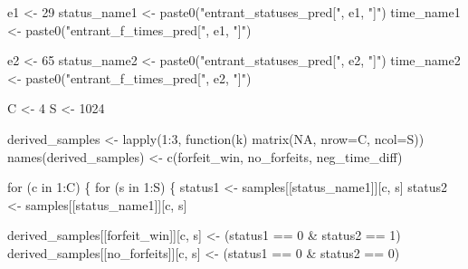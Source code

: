 \documentclass[
  letterpaper,
  DIV=11,
  numbers=noendperiod]{scrartcl}
\newenvironment{Shaded}{\begin{snugshade}}{\end{snugshade}}
\newcommand{\AttributeTok}[1]{\textcolor[rgb]{0.40,0.45,0.13}{#1}}
\newcommand{\ConstantTok}[1]{\textcolor[rgb]{0.56,0.35,0.01}{#1}}
\newcommand{\ControlFlowTok}[1]{\textcolor[rgb]{0.00,0.23,0.31}{#1}}
\newcommand{\DecValTok}[1]{\textcolor[rgb]{0.68,0.00,0.00}{#1}}
\newcommand{\FunctionTok}[1]{\textcolor[rgb]{0.28,0.35,0.67}{#1}}
\newcommand{\NormalTok}[1]{\textcolor[rgb]{0.00,0.23,0.31}{#1}}
\newcommand{\OtherTok}[1]{\textcolor[rgb]{0.00,0.23,0.31}{#1}}
\newcommand{\SpecialCharTok}[1]{\textcolor[rgb]{0.37,0.37,0.37}{#1}}
\newcommand{\StringTok}[1]{\textcolor[rgb]{0.13,0.47,0.30}{#1}}
\begin{document}
\begin{Shaded}
\begin{Highlighting}[]
\NormalTok{e1 }\OtherTok{\textless{}{-}} \DecValTok{29}
\NormalTok{status\_name1 }\OtherTok{\textless{}{-}} \FunctionTok{paste0}\NormalTok{(}\StringTok{"entrant\_statuses\_pred["}\NormalTok{, e1, }\StringTok{"]"}\NormalTok{)}
\NormalTok{time\_name1 }\OtherTok{\textless{}{-}} \FunctionTok{paste0}\NormalTok{(}\StringTok{"entrant\_f\_times\_pred["}\NormalTok{, e1, }\StringTok{"]"}\NormalTok{)}

\NormalTok{e2 }\OtherTok{\textless{}{-}} \DecValTok{65}
\NormalTok{status\_name2 }\OtherTok{\textless{}{-}} \FunctionTok{paste0}\NormalTok{(}\StringTok{"entrant\_statuses\_pred["}\NormalTok{, e2, }\StringTok{"]"}\NormalTok{)}
\NormalTok{time\_name2 }\OtherTok{\textless{}{-}} \FunctionTok{paste0}\NormalTok{(}\StringTok{"entrant\_f\_times\_pred["}\NormalTok{, e2, }\StringTok{"]"}\NormalTok{)}

\NormalTok{C }\OtherTok{\textless{}{-}} \DecValTok{4}
\NormalTok{S }\OtherTok{\textless{}{-}} \DecValTok{1024}

\NormalTok{derived\_samples }\OtherTok{\textless{}{-}} \FunctionTok{lapply}\NormalTok{(}\DecValTok{1}\SpecialCharTok{:}\DecValTok{3}\NormalTok{, }\ControlFlowTok{function}\NormalTok{(k) }\FunctionTok{matrix}\NormalTok{(}\ConstantTok{NA}\NormalTok{, }\AttributeTok{nrow=}\NormalTok{C, }\AttributeTok{ncol=}\NormalTok{S))}
\FunctionTok{names}\NormalTok{(derived\_samples) }\OtherTok{\textless{}{-}} \FunctionTok{c}\NormalTok{(}\StringTok{\textquotesingle{}forfeit\_win\textquotesingle{}}\NormalTok{, }\StringTok{\textquotesingle{}no\_forfeits\textquotesingle{}}\NormalTok{, }\StringTok{\textquotesingle{}neg\_time\_diff\textquotesingle{}}\NormalTok{)}

\ControlFlowTok{for}\NormalTok{ (c }\ControlFlowTok{in} \DecValTok{1}\SpecialCharTok{:}\NormalTok{C) \{}
  \ControlFlowTok{for}\NormalTok{ (s }\ControlFlowTok{in} \DecValTok{1}\SpecialCharTok{:}\NormalTok{S) \{}
\NormalTok{    status1 }\OtherTok{\textless{}{-}}\NormalTok{ samples[[status\_name1]][c, s]}
\NormalTok{    status2 }\OtherTok{\textless{}{-}}\NormalTok{ samples[[status\_name1]][c, s]}

\NormalTok{    derived\_samples[[}\StringTok{\textquotesingle{}forfeit\_win\textquotesingle{}}\NormalTok{]][c, s] }\OtherTok{\textless{}{-}}\NormalTok{ (status1 }\SpecialCharTok{==} \DecValTok{0} \SpecialCharTok{\&}\NormalTok{ status2 }\SpecialCharTok{==} \DecValTok{1}\NormalTok{)}
\NormalTok{    derived\_samples[[}\StringTok{\textquotesingle{}no\_forfeits\textquotesingle{}}\NormalTok{]][c, s] }\OtherTok{\textless{}{-}}\NormalTok{ (status1 }\SpecialCharTok{==} \DecValTok{0} \SpecialCharTok{\&}\NormalTok{ status2 }\SpecialCharTok{==} \DecValTok{0}\NormalTok{)}


\end{Highlighting}
\end{Shaded}
\end{document}

